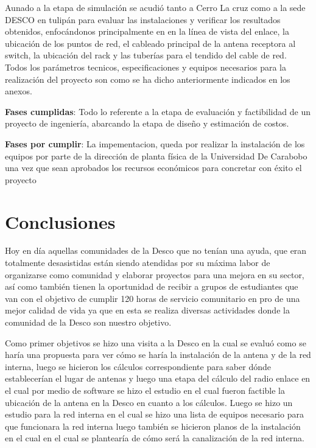 \documentclass[11pt, a4paper, twosides]{report}
\begin{document}
Aunado a la etapa de simulación  se acudió tanto a Cerro La cruz como a la sede DESCO en tulipán para evaluar las instalaciones y verificar los resultados obtenidos, enfocándonos principalmente en en la línea de vista del enlace, la ubicación de los puntos de red, el cableado principal de la antena receptora al switch, la ubicación del rack y las tuberías para el tendido del cable de red.
Todos los parámetros tecnicos, especificaciones y equipos necesarios para la realización del proyecto son como se ha dicho anteriormente indicados en los anexos.

\textbf{Fases cumplidas}: Todo lo referente a la etapa de evaluación y factibilidad de un proyecto de ingeniería, abarcando la etapa de diseño y estimación de costos.

\textbf{Fases por cumplir}: La impementacion, queda por realizar la instalación de los equipos por parte de la dirección de planta física de la Universidad De Carabobo una vez que sean aprobados los recursos económicos para concretar con éxito el proyecto


\chapter{Conclusiones} 
Hoy en día aquellas comunidades de la Desco que no tenían una ayuda, que eran totalmente desasistidas están siendo atendidas por su máxima labor de organizarse como comunidad y elaborar proyectos para una mejora en su sector, así como también tienen la oportunidad de recibir a grupos de estudiantes que van con el objetivo de cumplir 120 horas de servicio comunitario en pro de una mejor calidad de vida ya que en esta se realiza diversas actividades donde la comunidad de la Desco son nuestro objetivo.

Como primer objetivos se hizo una visita a la Desco en la cual se evaluó como se haría una propuesta para ver cómo se haría la instalación de la antena y de la red interna, luego se hicieron los cálculos correspondiente para saber dónde establecerían el lugar de antenas y luego una etapa del cálculo del radio enlace en el cual por medio de software se hizo el estudio en el cual fueron factible la ubicación de la antena en la Desco en cuanto a los cálculos. Luego se hizo un estudio para la red interna en el cual se hizo una lista de equipos necesario para que funcionara la red interna luego también se hicieron planos de la instalación en el cual en el cual se plantearía de cómo será la canalización de la red interna.
\end{document}
